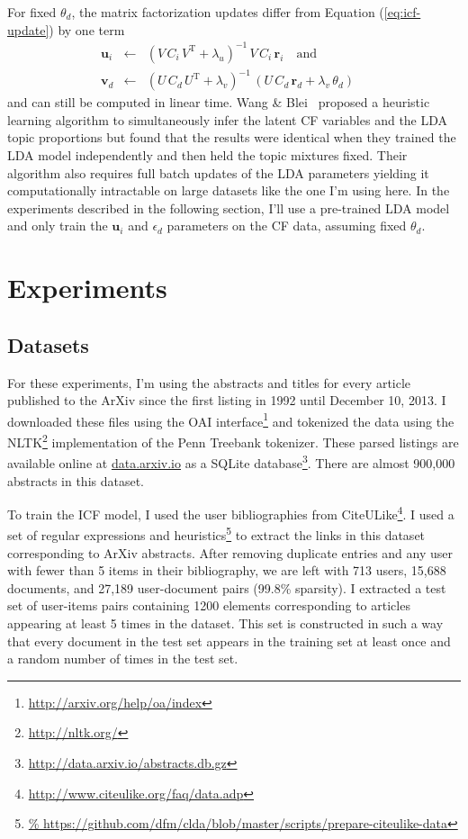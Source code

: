 \documentclass[11pt]{article}
\newcommand{\eq}[1]{Equation (\ref{eq:#1})}
\begin{document}
For fixed $\theta_d$, the matrix factorization updates differ from
\eq{icf-update} by one term \cite{ctr}
\begin{eqnarray}
\mathbf{u}_i &\gets& (V\,C_i\,V^\mathrm{T}+\lambda_u)^{-1}\,
                     V\,C_i\,\mathbf{r}_i
\quad \mathrm{and} \\
\mathbf{v}_d &\gets& (U\,C_d\,U^\mathrm{T} + \lambda_v)^{-1}\,(U\,C_d\,
                     \mathbf{r}_d + \lambda_v\,\theta_d) \quad \nonumber
\end{eqnarray}
and can still be computed in linear time.
Wang \& Blei~ proposed a heuristic learning algorithm to
simultaneously infer the latent CF variables and the LDA topic proportions but
found that the results were identical when they trained the LDA model
independently and then held the topic mixtures fixed.
Their algorithm also requires full batch updates of the LDA parameters
yielding it computationally intractable on large datasets like the one I'm
using here.
In the experiments described in the following section, I'll use a pre-trained
LDA model and only train the $\mathbf{u}_i$ and $\epsilon_d$ parameters on the
CF data, assuming fixed $\theta_d$.

\section{Experiments}

\subsection{Datasets}

For these experiments, I'm using the abstracts and titles for every article
published to the ArXiv since the first listing in 1992 until December 10,
2013.
I downloaded these files using the OAI
interface\footnote{\url{http://arxiv.org/help/oa/index}} and tokenized the
data using the NLTK\footnote{\url{http://nltk.org/}} implementation of the
Penn Treebank tokenizer.
These parsed listings are available online at \url{data.arxiv.io} as a SQLite
database\footnote{\url{http://data.arxiv.io/abstracts.db.gz}}.
There are almost 900,000 abstracts in this dataset.

To train the ICF model, I used the user bibliographies from
CiteULike\footnote{\url{http://www.citeulike.org/faq/data.adp}}.
I used a set of regular expressions and
heuristics\footnote{\url{%
https://github.com/dfm/clda/blob/master/scripts/prepare-citeulike-data}} to
extract the links in this dataset corresponding to ArXiv abstracts.
After removing duplicate entries and any user with fewer than 5 items in their
bibliography, we are left with 713 users, 15,688 documents, and 27,189
user-document pairs (99.8\% sparsity).
I extracted a test set of user-items pairs containing 1200 elements
corresponding to articles appearing at least 5 times in the dataset.
This set is constructed in such a way that every document in the test set
appears in the training set at least once and a random number of times in the
test set.
\end{document}
